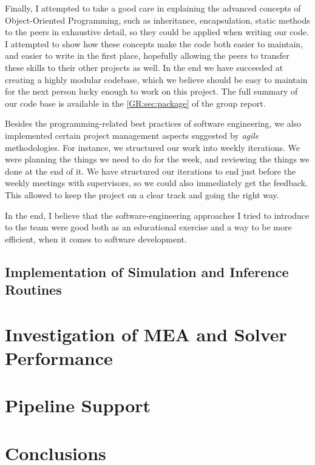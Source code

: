 Finally, I attempted to take a good care in explaining the advanced concepts of Object-Oriented Programming, such as inheritance, encapsulation, static methods to the peers in exhaustive detail, so they could be applied when writing our code. 
I attempted to show how these concepts make the code both easier to maintain, and easier to write in the first place, hopefully allowing the peers to transfer these skills to their other projects as well.
In the end we have succeeded at creating a highly modular codebase, which we believe should be easy to maintain for the next person lucky enough to work on this project. The full summary of our code base is available in the \autoref*{GR:sec:package} of the group report.

Besides the programming-related best practices of software engineering, we also implemented certain project management aspects suggested by \emph{agile} methodologies. 
For instance, we structured our work into weekly iterations. We were planning the things we need to do for the week, and reviewing the things we done at the end of it. 
We have structured our iterations to end just before the weekly meetings with supervisors, so we could also immediately get the feedback.
This allowed to keep the project on a clear track and going the right way.


In the end, I believe that the software-engineering approaches I tried to introduce to the team were good both as an educational exercise and a way to be more efficient, when it comes to software development.

\subsection{Implementation of Simulation and Inference Routines}
\section{Investigation of MEA and Solver Performance}
\section{Pipeline Support}
\section{Conclusions}

